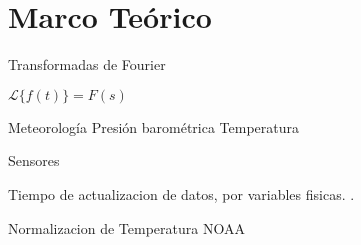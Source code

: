 \section{Marco Teórico}

Transformadas de Fourier

$\mathscr{L}\{f(t)\}=F(s)$

Meteorología
   Presión barométrica
   Temperatura

Sensores

Tiempo de actualizacion de datos, por variables fisicas.
\cite{davis:6152C_6162C_SS}.

Normalizacion de Temperatura
NOAA

